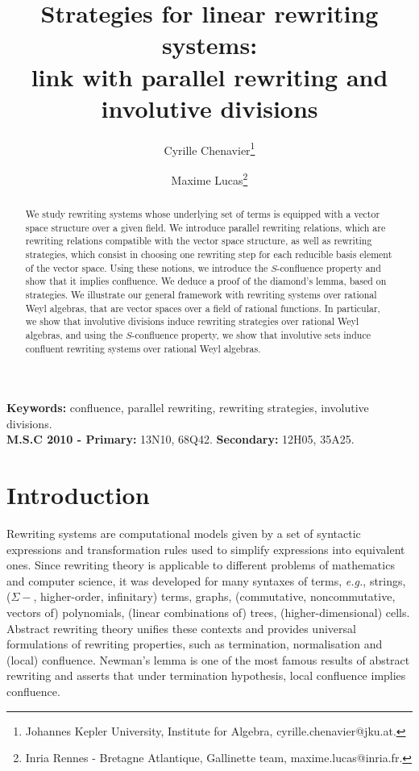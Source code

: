 \documentclass[11pt]{article}
\theoremstyle{definition}
\newcommand\eg{\emph{e.g.}}
\begin{document}
\title{Strategies for linear rewriting systems:\\[0.2cm]
 link with parallel rewriting and involutive divisions\vspace{0.5cm}}
\author{Cyrille Chenavier\footnote{
    Johannes Kepler University, Institute for Algebra,
    cyrille.chenavier@jku.at.
  }\and Maxime Lucas\footnote{Inria Rennes - Bretagne Atlantique,
    Gallinette team, maxime.lucas@inria.fr.}
  }
\date{}

\maketitle
      
\begin{abstract}
  We study rewriting systems whose underlying set of terms is equipped with a
  vector space structure over a given field. We introduce parallel rewriting
  relations, which are rewriting relations compatible with the vector space
  structure, as well as rewriting strategies, which consist in choosing one
  rewriting step for each reducible basis element of the vector space. Using
  these notions, we introduce the $S$-confluence property and show that it
  implies confluence. We deduce a proof of the diamond's lemma, based on
  strategies. We illustrate our general framework with rewriting systems over
  rational Weyl algebras, that are vector spaces over a field of rational
  functions. In particular, we show that involutive divisions induce rewriting
  strategies over rational Weyl algebras, and using the $S$-confluence property,
  we show that involutive sets induce confluent rewriting systems over rational
  Weyl algebras.
\end{abstract}
\noindent
\begin{small}\textbf{Keywords:} confluence, parallel rewriting, rewriting
  strategies, involutive divisions.\\[0.2cm]
  \textbf{M.S.C 2010 - Primary:} 13N10, 68Q42. \textbf{Secondary:} 12H05,
  35A25.
\end{small}

\tableofcontents

\section{Introduction}

Rewriting systems are computational models given by a set of syntactic
expressions and transformation rules used to simplify expressions into
equivalent ones. Since rewriting theory is applicable to different
problems of mathematics and computer science, it was developed for many
syntaxes of terms, \eg, strings, ($\Sigma-$, higher-order, infinitary)
terms, graphs, (commutative, noncommutative, vectors of) polynomials,
(linear combinations of) trees, (higher-dimensional) cells. Abstract
rewriting theory unifies these contexts and provides universal
formulations of rewriting properties, such as termination, normalisation
and (local) confluence. Newman's lemma is one of the most famous results 
of abstract rewriting and asserts that under termination hypothesis, 
local confluence implies confluence.
\medskip
\end{document}
